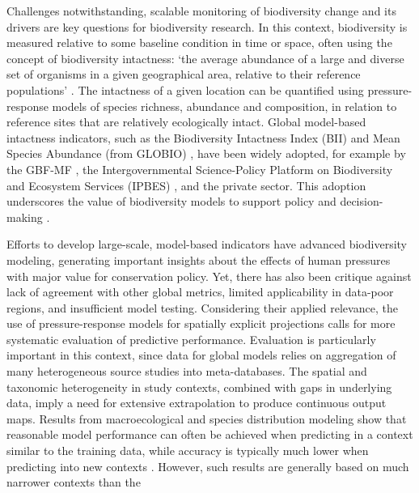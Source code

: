 Challenges notwithstanding, scalable monitoring of biodiversity change and its drivers are key questions for biodiversity research\cite{purvis2025}. In this context, biodiversity is measured relative to some baseline condition in time or space, often using the concept of biodiversity intactness: ‘the average abundance of a large and diverse set of organisms in a given geographical area, relative to their reference populations’ \cite{scholes2005}. The intactness of a given location can be quantified using pressure-response models of species richness, abundance and composition, in relation to reference sites that are relatively ecologically intact. Global model-based intactness indicators, such as the Biodiversity Intactness Index (BII) \cite{newbold2015,newbold2016} and Mean Species Abundance (from GLOBIO) \cite{schipper2020}, have been widely adopted, for example by the GBF-MF \cite{gbfmf2025}, the Intergovernmental Science-Policy Platform on Biodiversity and Ecosystem Services (IPBES) \cite{ipbes2019}, and the private sector\cite{burgess2024}. This adoption underscores the value of biodiversity models to support policy and decision-making \cite{zurell2025,burgess2024,affinito2024,purvis2025}.

Efforts to develop large-scale, model-based indicators have advanced biodiversity modeling, generating important insights about the effects of human pressures\cite{newbold2015,schipper2020} with major value for conservation policy. Yet, there has also been critique against lack of agreement with other global metrics\cite{martin2019}, limited applicability in data-poor regions\cite{clements2025}, and insufficient model testing\cite{martin2019}. Considering their applied relevance, the use of pressure-response models for spatially explicit projections calls for more systematic evaluation of predictive performance. Evaluation is particularly important in this context, since data for global models relies on aggregation of many heterogeneous source studies into meta-databases. The spatial and taxonomic heterogeneity in study contexts, combined with gaps in underlying data, imply a need for extensive extrapolation to produce continuous output maps. Results from macroecological and species distribution modeling show that reasonable model performance can often be achieved when predicting in a context similar to the training data, while accuracy is typically much lower when predicting into new contexts \cite{roberts2017,meyer2021,meyer2022}. However, such results are generally based on much narrower contexts than the

